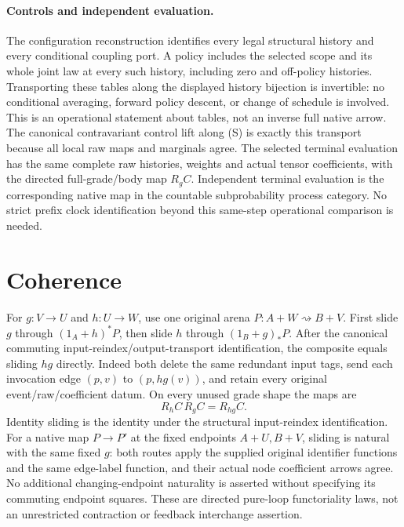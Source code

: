 \documentclass[11pt]{article}
\begin{document}
\paragraph{Controls and independent evaluation.}
The configuration reconstruction identifies every legal structural history and every conditional coupling port. A policy includes the selected scope and its whole joint law at every such history, including zero and off-policy histories. Transporting these tables along the displayed history bijection is invertible: no conditional averaging, forward policy descent, or change of schedule is involved. This is an operational statement about tables, not an inverse full native arrow. The canonical contravariant control lift along (S) is exactly this transport because all local raw maps and marginals agree. The selected terminal evaluation has the same complete raw histories, weights and actual tensor coefficients, with the directed full-grade/body map $R_g C$. Independent terminal evaluation is the corresponding native map in the countable subprobability process category. No strict prefix clock identification beyond this same-step operational comparison is needed.

\section{Coherence}
For $g:V\to U$ and $h:U\to W$, use one original arena $P:A+W\rightsquigarrow B+V$. First slide $g$ through $(1_A+h)^*P$, then slide $h$ through $(1_B+g)_*P$. After the canonical commuting input-reindex/output-transport identification, the composite equals sliding $hg$ directly. Indeed both delete the same redundant input tags, send each invocation edge $(p,v)$ to $(p,hg(v))$, and retain every original event/raw/coefficient datum. On every unused grade shape the maps are
\[
 R_h C\,R_g C=R_{hg}C.
\]
Identity sliding is the identity under the structural input-reindex identification. For a native map $P\to P'$ at the fixed endpoints $A+U,B+V$, sliding is natural with the same fixed $g$: both routes apply the supplied original identifier functions and the same edge-label function, and their actual node coefficient arrows agree. No additional changing-endpoint naturality is asserted without specifying its commuting endpoint squares. These are directed pure-loop functoriality laws, not an unrestricted contraction or feedback interchange assertion.
\end{document}
